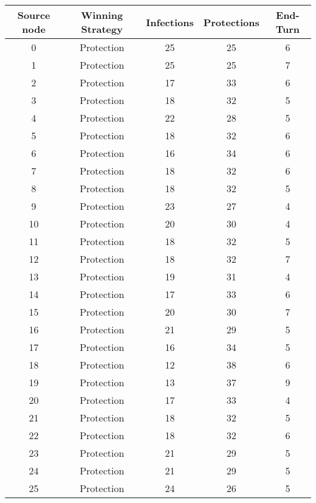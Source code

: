 \documentclass[results.tex]{subfiles}
\begin{document}
\begin{center}
  \begin{tabular}{| c || c | c | c | c |}
    \hline
    {\bfseries Source node} & {\bfseries Winning Strategy} & {\bfseries Infections} & {\bfseries Protections} & {\bfseries End-Turn} \\  %
    \hline\hline
    0 & Protection & 25 & 25 & 6 \\ 
    \hline
    1 & Protection & 25 & 25 & 7 \\ 
    \hline
    2 & Protection & 17 & 33 & 6 \\ 
    \hline
    3 & Protection & 18 & 32 & 5 \\ 
    \hline
    4 & Protection & 22 & 28 & 5 \\ 
    \hline
    5 & Protection & 18 & 32 & 6 \\ 
    \hline
    6 & Protection & 16 & 34 & 6 \\ 
    \hline
    7 & Protection & 18 & 32 & 6 \\ 
    \hline
    8 & Protection & 18 & 32 & 5 \\ 
    \hline
    9 & Protection & 23 & 27 & 4 \\ 
    \hline
    10 & Protection & 20 & 30 & 4 \\ 
    \hline
    11 & Protection & 18 & 32 & 5 \\ 
    \hline
    12 & Protection & 18 & 32 & 7 \\ 
    \hline
    13 & Protection & 19 & 31 & 4 \\ 
    \hline
    14 & Protection & 17 & 33 & 6 \\ 
    \hline
    15 & Protection & 20 & 30 & 7 \\ 
    \hline
    16 & Protection & 21 & 29 & 5 \\ 
    \hline
    17 & Protection & 16 & 34 & 5 \\ 
    \hline
    18 & Protection & 12 & 38 & 6 \\ 
    \hline
    19 & Protection & 13 & 37 & 9 \\ 
    \hline
    20 & Protection & 17 & 33 & 4 \\ 
    \hline
    21 & Protection & 18 & 32 & 5 \\ 
    \hline
    22 & Protection & 18 & 32 & 6 \\ 
    \hline
    23 & Protection & 21 & 29 & 5 \\ 
    \hline
    24 & Protection & 21 & 29 & 5 \\ 
    \hline
    25 & Protection & 24 & 26 & 5 \\ 

\end{tabular}
\end{center}
\end{document}

